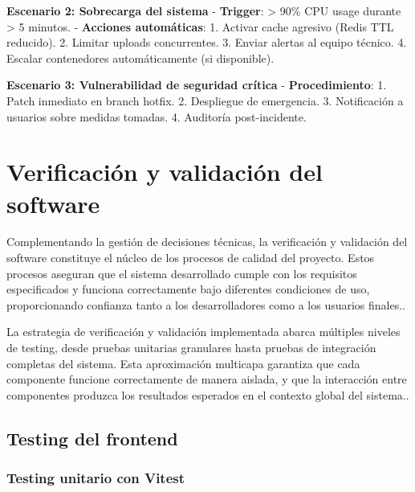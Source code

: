 \documentclass[12pt,a4paper,oneside]{report}
\begin{document}
\textbf{Escenario 2: Sobrecarga del sistema} - \textbf{Trigger}:
\textgreater{} 90\% CPU usage durante \textgreater{} 5 minutos. -
\textbf{Acciones automáticas}: 1. Activar cache agresivo (Redis TTL
reducido). 2. Limitar uploads concurrentes. 3. Enviar alertas al equipo
técnico. 4. Escalar contenedores automáticamente (si disponible).

\textbf{Escenario 3: Vulnerabilidad de seguridad crítica} -
\textbf{Procedimiento}: 1. Patch inmediato en branch hotfix. 2.
Despliegue de emergencia. 3. Notificación a usuarios sobre medidas
tomadas. 4. Auditoría post-incidente.

\section{Verificación y validación del
software}\label{verificaciuxf3n-y-validaciuxf3n-del-software}

Complementando la gestión de decisiones técnicas, la verificación y
validación del software constituye el núcleo de los procesos de calidad
del proyecto. Estos procesos aseguran que el sistema desarrollado cumple
con los requisitos especificados y funciona correctamente bajo
diferentes condiciones de uso, proporcionando confianza tanto a los
desarrolladores como a los usuarios finales..

La estrategia de verificación y validación implementada abarca múltiples
niveles de testing, desde pruebas unitarias granulares hasta pruebas de
integración completas del sistema. Esta aproximación multicapa garantiza
que cada componente funcione correctamente de manera aislada, y que la
interacción entre componentes produzca los resultados esperados en el
contexto global del sistema..

\subsection{Testing del frontend}\label{testing-del-frontend}

\subsubsection{Testing unitario con
Vitest}\label{testing-unitario-con-vitest}
\end{document}
